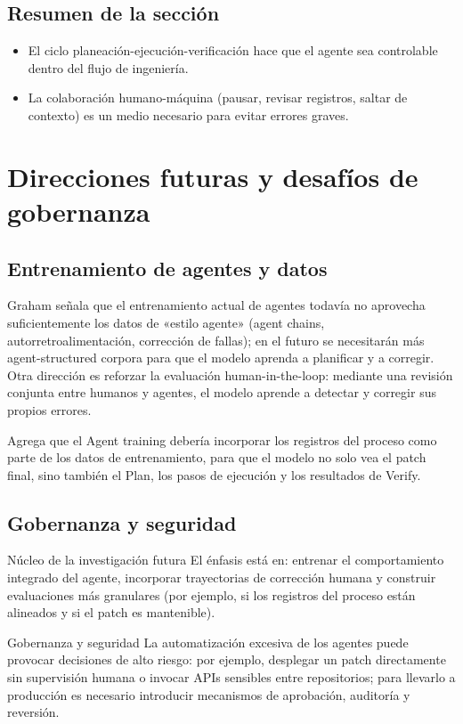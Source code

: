 \documentclass[a4paper]{article}
\begin{document}
\subsection{Resumen de la sección}
\begin{itemize}
    \item El ciclo planeación-ejecución-verificación hace que el agente sea controlable dentro del flujo de ingeniería.
    \item La colaboración humano-máquina (pausar, revisar registros, saltar de contexto) es un medio necesario para evitar errores graves.
\end{itemize}
\section{Direcciones futuras y desafíos de gobernanza}
\subsection{Entrenamiento de agentes y datos}
Graham señala que el entrenamiento actual de agentes todavía no aprovecha suficientemente los datos de «estilo agente» (agent chains, autorretroalimentación, corrección de fallas); en el futuro se necesitarán más agent-structured corpora para que el modelo aprenda a planificar y a corregir. Otra dirección es reforzar la evaluación human-in-the-loop: mediante una revisión conjunta entre humanos y agentes, el modelo aprende a detectar y corregir sus propios errores.

Agrega que el Agent training debería incorporar los registros del proceso como parte de los datos de entrenamiento, para que el modelo no solo vea el patch final, sino también el Plan, los pasos de ejecución y los resultados de Verify.

\subsection{Gobernanza y seguridad}
\begin{knowledgebox}{Núcleo de la investigación futura}
El énfasis está en: entrenar el comportamiento integrado del agente, incorporar trayectorias de corrección humana y construir evaluaciones más granulares (por ejemplo, si los registros del proceso están alineados y si el patch es mantenible).
\end{knowledgebox}

\begin{warningbox}{Gobernanza y seguridad}
La automatización excesiva de los agentes puede provocar decisiones de alto riesgo: por ejemplo, desplegar un patch directamente sin supervisión humana o invocar APIs sensibles entre repositorios; para llevarlo a producción es necesario introducir mecanismos de aprobación, auditoría y reversión.
\end{warningbox}
\end{document}
